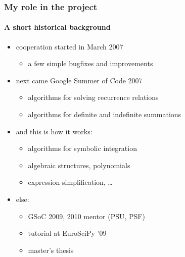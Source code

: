 \documentclass{beamer}
\begin{document}
\begin{frame}
    \frametitle{My role in the project}
    \framesubtitle{A short historical background}

    \begin{itemize}
        \item cooperation started in March 2007
            \begin{itemize}
                \item a few simple bugfixes and improvements
            \end{itemize}
            \pause
        \item next came Google Summer of Code 2007
            \begin{itemize}
                \item algorithms for solving recurrence relations
                \item algorithms for definite and indefinite summations
            \end{itemize}
            \pause
        \item and this is how it works:
            \begin{itemize}
                \item algorithms for symbolic integration
                \item algebraic structures, polynomials
                \item expression simplification, \ldots
            \end{itemize}
            \pause
        \item else:
            \begin{itemize}
                \item GSoC 2009, 2010 mentor (PSU, PSF)
                \item tutorial at EuroSciPy '09
                \item master's thesis
            \end{itemize}
    \end{itemize}
\end{frame}
\end{document}

